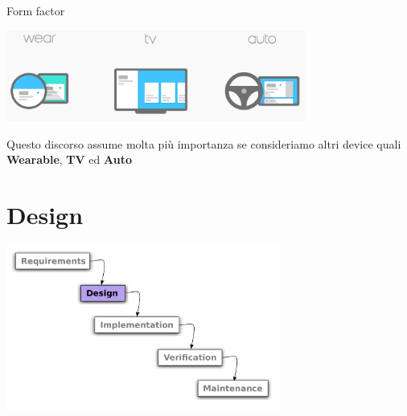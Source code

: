 \documentclass[xcolor=svgnames,11pt]{beamer}
\begin{document}
\begin{frame}{Form factor}

\begin{center}

\includegraphics[height=3cm]{multiscreen.png}

\end{center}

\medskip
\pause

\begin{block}

Questo discorso assume molta pi\`u importanza se consideriamo altri device quali \textbf{Wearable}, \textbf{TV} ed \textbf{Auto}

\end{block}
\end{frame}

\section{Design}

\begin{frame}
\begin{center}
\includegraphics[width=9cm]{waterfall_2.pdf}
\end{center}
\end{frame}
\end{document}
